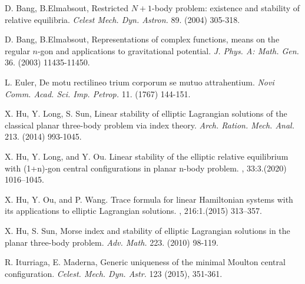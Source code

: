 \documentclass[11pt]{article}
\begin{document}
\begin{thebibliography}{}

 D. Bang, B.Elmabsout, Restricted $N+1$-body problem: existence
and stability of relative equilibria.
{\it Celest Mech. Dyn. Astron.}  89. (2004) 305-318.

 D. Bang, B.Elmabsout, Representations of complex functions, means on the regular $n$-gon
and applications to gravitational potential.
{\it J. Phys. A: Math. Gen.}  36. (2003) 11435-11450.

 L. Euler, De motu rectilineo trium corporum se mutuo
attrahentium. {\it Novi Comm. Acad. Sci. Imp. Petrop.}  11. (1767) 144-151.


 X. Hu, Y. Long, S. Sun, Linear stability of elliptic Lagrangian
solutions of the classical planar three-body problem via index theory.
{\it Arch. Ration. Mech. Anal.} 213. (2014) 993-1045.

X. Hu, Y. Long, and Y. Ou.
\newblock Linear stability of the elliptic relative equilibrium with (1+n)-gon
central configurations in planar n-body problem.
, 33:3.(2020) 1016--1045.


X. Hu, Y. Ou, and P. Wang.
\newblock Trace formula for linear {H}amiltonian systems with its applications
to elliptic {L}agrangian solutions.
, 216:1.(2015) 313--357.

 X. Hu, S. Sun, Morse index and stability of elliptic Lagrangian
solutions in the planar three-body problem. {\it Adv. Math.} 223. (2010) 98-119.


 R. Iturriaga, E. Maderna, Generic uniqueness of the minimal
Moulton central configuration. {\it Celest. Mech. Dyn. Astr.} 123 (2015), 351-361.



\end{thebibliography}
\end{document}
